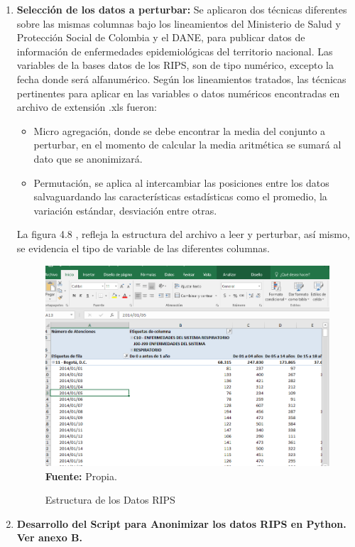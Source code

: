 \documentclass[a4paper,openright,12pt]{book}
\theoremstyle{definition}
\theoremstyle{remark}
\begin{document}
\begin{enumerate}
	\item \textbf{Selección de los datos a perturbar:} Se aplicaron dos técnicas diferentes sobre las mismas columnas bajo los lineamientos del Ministerio de Salud y Protección Social de Colombia y el DANE, para publicar datos de información de enfermedades epidemiológicas del territorio nacional. Las variables de la bases datos de los RIPS, son de tipo numérico, excepto la fecha donde será alfanumérico. Según los lineamientos tratados, las técnicas pertinentes para aplicar en las variables o datos numéricos encontradas en archivo de extensión .xls fueron:
    \begin{itemize}
    	\item Micro agregación, donde se debe encontrar la media del conjunto a perturbar, en el momento de calcular la media aritmética se sumará al dato que se anonimizará.
        \item Permutación, se aplica al intercambiar las posiciones entre los datos salvaguardando las características estadísticas como el promedio, la variación estándar, desviación entre otras.
    \end{itemize}
La figura 4.8 , refleja la estructura del archivo a leer y perturbar, así mismo, se evidencia el tipo de variable de las diferentes columnas.
  \begin{figure}[!ht]
\centering
\caption{Estructura de los Datos RIPS} 
 \includegraphics[scale=0.42]{Datos_Rips}
\label{fig:Datos_Rips}
\\ \textbf{Fuente:} Propia.
\end{figure}    
    \item \textbf{Desarrollo del Script para Anonimizar los datos RIPS en Python. Ver anexo B.}

\end{enumerate}
\end{document}
